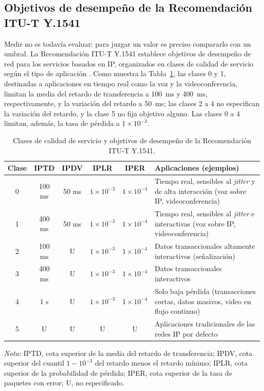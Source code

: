 \subsection{Objetivos de desempeño de la Recomendación ITU-T Y.1541}

Medir no es todavía evaluar: para juzgar un valor es preciso compararlo con un umbral. La Recomendación ITU-T Y.1541 establece objetivos de desempeño de red para los servicios basados en IP, organizados en clases de calidad de servicio según el tipo de aplicación \cite{ituy1541}. Como muestra la Tabla~\ref{tab:clases_y1541}, las clases 0 y 1, destinadas a aplicaciones en tiempo real como la voz y la videoconferencia, limitan la media del retardo de transferencia a 100~ms y 400~ms, respectivamente, y la variación del retardo a 50~ms; las clases 2 a 4 no especifican la variación del retardo, y la clase 5 no fija objetivo alguno. Las clases 0 a 4 limitan, además, la tasa de pérdida a $1\times10^{-3}$.

\begin{table}[htbp]
  \centering
  \caption{Clases de calidad de servicio y objetivos de desempeño de la Recomendación ITU-T Y.1541.}
  \label{tab:clases_y1541}
  \footnotesize
  \renewcommand{\arraystretch}{1.2}
  \setlength{\tabcolsep}{4pt}
  \begin{tabularx}{\textwidth}{|c|c|c|c|c|>{\raggedright\arraybackslash}X|}
    \hline
    \textbf{Clase} & \textbf{IPTD} & \textbf{IPDV} & \textbf{IPLR} & \textbf{IPER} & \textbf{Aplicaciones (ejemplos)} \\
    \hline
    0 & 100 ms & 50 ms & $1\times10^{-3}$ & $1\times10^{-4}$ & Tiempo real, sensibles al \textit{jitter} y de alta interacción (voz sobre IP, videoconferencia) \\
    \hline
    1 & 400 ms & 50 ms & $1\times10^{-3}$ & $1\times10^{-4}$ & Tiempo real, sensibles al \textit{jitter} e interactivas (voz sobre IP, videoconferencia) \\
    \hline
    2 & 100 ms & U & $1\times10^{-3}$ & $1\times10^{-4}$ & Datos transaccionales altamente interactivos (señalización) \\
    \hline
    3 & 400 ms & U & $1\times10^{-3}$ & $1\times10^{-4}$ & Datos transaccionales interactivos \\
    \hline
    4 & 1 s & U & $1\times10^{-3}$ & $1\times10^{-4}$ & Solo baja pérdida (transacciones cortas, datos masivos, video en flujo continuo) \\
    \hline
    5 & U & U & U & U & Aplicaciones tradicionales de las redes IP por defecto \\
    \hline
  \end{tabularx}
  \vspace{2pt}
  \raggedright
  \noindent\textit{Nota:} IPTD, cota superior de la media del retardo de transferencia; IPDV, cota superior del cuantil $1-10^{-3}$ del retardo menos el retardo mínimo; IPLR, cota superior de la probabilidad de pérdida; IPER, cota superior de la tasa de paquetes con error; U, no especificado.
\end{table}

